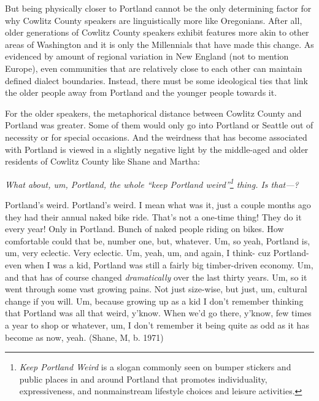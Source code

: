 But being physically closer to Portland cannot be the only determining factor for why Cowlitz County speakers are linguistically more like Oregonians. After all, older generations of Cowlitz County speakers exhibit features more akin to other areas of Washington and it is only the Millennials that have made this change. As evidenced by amount of regional variation in New England (not to mention Europe), even communities that are relatively close to each other can maintain defined dialect boundaries. Instead, there must be some ideological ties that link the older people away from Portland and the younger people towards it.

For the older speakers, the metaphorical distance between Cowlitz County and Portland was greater. Some of them would only go into Portland or Seattle out of necessity or for special occasions. And the weirdness that has become associated with Portland is viewed in a slightly negative light by the middle-aged and older residents of Cowlitz County like Shane and Martha:
\begin{num_quote}
    \textit{What about, um, Portland, the whole ``keep Portland weird''\hspace{1.5pt}\footnote{\textit{Keep Portland Weird} is a slogan commonly seen on bumper stickers and public places in and around Portland that promotes individuality, expressiveness, and nonmainstream lifestyle choices and leisure activities.} thing. Is that---?}

    Portland's weird. Portland's weird. I mean what was it, just a couple months ago they had their annual naked bike ride. That's not a one-time thing! They do it every year! Only in Portland. Bunch of naked people riding on bikes. How comfortable could that be, number one, but, whatever. Um, so yeah, Portland is, um, very eclectic. Very eclectic. Um, yeah, um, and again, I think- cuz Portland- even when I was a kid, Portland was still a fairly big timber-driven economy. Um, and that has of course changed \textit{dramatically} over the last thirty years. Um, so it went through some vast growing pains. Not just size-wise, but just, um, cultural change if you will. Um, because growing up as a kid I don't remember thinking that Portland was all that weird, y'know. When we'd go there, y'know, few times a year to shop or whatever, um, I don't remember it being quite as odd as it has become as now, yeah. (Shane, M, b. 1971)\label{quote:portlands_weird}
\end{num_quote}
